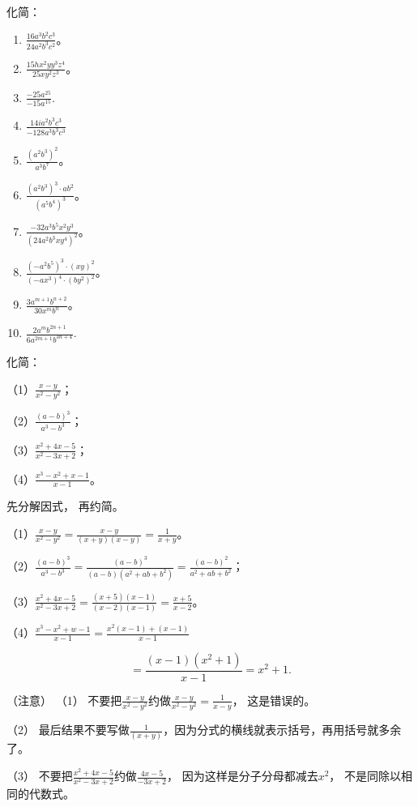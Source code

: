 化简：

\begin{enumerate}[start=1]
\item
  \(\frac{16a^3b^2c^3}{24a^2b^3c^2}\)。
\item
  \(\frac{15hx^2yy^3z^4}{25xy^2z^3}\)。
\item
  \(\frac{-25a^{25}}{-15a^{15}}.\)
\item
  \(\frac{14ia^2b^3c^3}{-128a^3b^3c^3}\)
\item
  \(\frac{(a^2b^3)^2}{a^3b^7}\)。
\item
  \(\frac{(a^2b^3)^3 \cdot a b^2}{(a^5b^4)^3}\)。
\item
  \(\frac{-32a^3b^5x^2y^3}{(24a^2b^3xy^4)^2}\)。
\item
  \(\frac{(-a^2b^5)^3 \cdot (xy)^2}{(-ax^3)^4 \cdot (by^2)^2}\)。
\item
  \(\frac{3a^{m+1}b^{n+2}}{30x^{m}b^{n}}\)。
\item
  \(\frac{2a^{m}b^{2n+1}}{6a^{2m+1}b^{3n+4}}.\)
\end{enumerate}

 化简：

（1）\(\frac{x - y}{x^2 - y^2}\)；

（2）\(\frac{(a - b)^3}{a^3 - b^3}\)；

（3）\(\frac{x^2 + 4x - 5}{x^2 - 3x + 2}\)；

（4）\(\frac{x^3 - x^2 + x - 1}{x - 1}\)。

 先分解因式， 再约简。


（1）\(\frac{x - y}{x^2 - y^2} = \frac{x - y}{(x + y)(x - y)} = \frac{1}{x + y}\)。

（2）\(\frac{(a - b)^3}{a^3 - b^3} = \frac{(a - b)^3}{(a - b)(a^2 + ab + b^2)} = \frac{(a - b)^2}{a^2 + ab + b^2}\)；

（3）\(\frac{x^2 + 4x - 5}{x^2 - 3x + 2} = \frac{(x + 5)(x - 1)}{(x - 2)(x - 1)} = \frac{x + 5}{x - 2}\)。

（4）\(\frac{x^3 - x^2 + w - 1}{x - 1} = \frac{x^2(x - 1) + (x - 1)}{x - 1}\)

\[
= \frac{(x - 1) (x ^{2} + 1)}{x - 1} = x ^{2} + 1.
\]

（注意） （1）
不要把\(\frac{x - y}{x^2 - y^2}\)约做\(\frac{x - y}{x^2 - y^2} = \frac{1}{x - y}\)，
这是错误的。

（2）
最后结果不要写做\(\frac{1}{(x + y)}\)，因为分式的横线就表示括号，再用括号就多余了。

（3）
不要把\(\frac{x^2 + 4x - 5}{x^2 - 3x + 2}\)约做\(\frac{4x - 5}{-3x + 2}\)，
因为这样是分子分母都减去\(x^2\)， 不是同除以相同的代数式。

